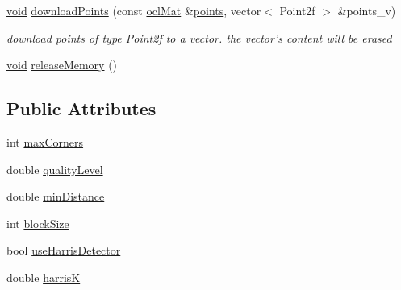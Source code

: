 \begin{DoxyCompactItemize}
\hyperlink{legacy_8hpp_a8bb47f092d473522721002c86c13b94e}{void} \hyperlink{classcv_1_1ocl_1_1GoodFeaturesToTrackDetector__OCL_a24ffac046f1074473447b2318339494d}{download\-Points} (const \hyperlink{classcv_1_1ocl_1_1oclMat}{ocl\-Mat} \&\hyperlink{legacy_8hpp_a8c4b676395bf614cc92b782d12f18847}{points}, vector$<$ Point2f $>$ \&points\-\_\-v)
\begin{DoxyCompactList}\small\item\em download points of type Point2f to a vector. the vector's content will be erased \end{DoxyCompactList}\item 
\hyperlink{legacy_8hpp_a8bb47f092d473522721002c86c13b94e}{void} \hyperlink{classcv_1_1ocl_1_1GoodFeaturesToTrackDetector__OCL_ab1f0e4d0f1ff78bf927b1ba9eda4b134}{release\-Memory} ()
\end{DoxyCompactItemize}
\subsection*{Public Attributes}
\begin{DoxyCompactItemize}
\item 
int \hyperlink{classcv_1_1ocl_1_1GoodFeaturesToTrackDetector__OCL_ac8311ca2527c02b94d0e05d6b345e9ac}{max\-Corners}
\item 
double \hyperlink{classcv_1_1ocl_1_1GoodFeaturesToTrackDetector__OCL_a19ac1b83bc6602c6a1a966e904ca215f}{quality\-Level}
\item 
double \hyperlink{classcv_1_1ocl_1_1GoodFeaturesToTrackDetector__OCL_a984603138318d1a9a1ebc5a42461c7e4}{min\-Distance}
\item 
int \hyperlink{classcv_1_1ocl_1_1GoodFeaturesToTrackDetector__OCL_a0a0cd73b830a541bc601822474288439}{block\-Size}
\item 
bool \hyperlink{classcv_1_1ocl_1_1GoodFeaturesToTrackDetector__OCL_abf60ed728142b02145b86ad2c68f06c6}{use\-Harris\-Detector}
\item 
double \hyperlink{classcv_1_1ocl_1_1GoodFeaturesToTrackDetector__OCL_af5c1120be137bb1253838cb0c7e0d35e}{harris\-K}
\end{DoxyCompactItemize}


